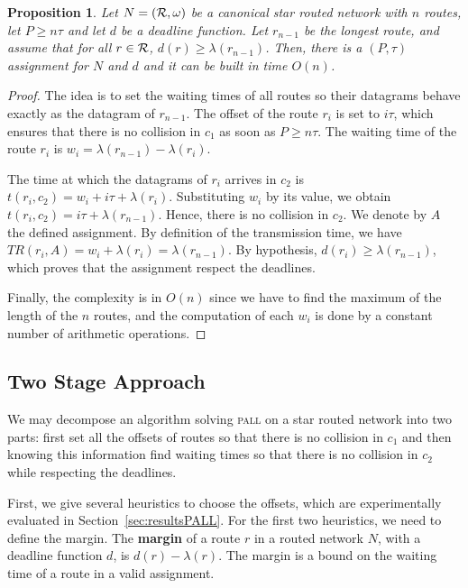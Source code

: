 \documentclass[a4paper,10pt]{journal}
\newtheorem{proposition}{Proposition}
\newcommand\pall{\textsc{pall}\xspace}
\begin{document}
	 \begin{proposition}\label{prop:asym}
	Let $N = ({\cal R}, \omega)$ be a canonical star routed network with $n$ routes, let $P \geq n\tau$ and let $d$ be a deadline function. Let $r_{n-1}$ be the longest route, and assume that for all $r\in {\cal R}$, $d(r) \geq \lambda(r_{n-1})$. Then, there is a $(P,\tau)$ assignment for $N$ and $d$ and it can be built in time $O(n)$.
	 \end{proposition}
      \begin{proof}
       The idea is to set the waiting times of all routes so their datagrams behave exactly as the datagram of $r_{n-1}$. The offset of the route $r_i$ is set to $i\tau$, which ensures that there is no collision in $c_1$ as soon as $P \geq n\tau$. The waiting time of the route $r_i$ is $w_i = \lambda(r_{n-1}) - \lambda(r_{i})$.
        
    The time at which the datagrams of $r_i$ arrives in $c_2$ is $t(r_i, c_2) = w_i + i\tau + \lambda(r_{i})$. Substituting $w_i$ by its value, we obtain $t(r_i, c_2) =  i\tau + \lambda(r_{n-1})$.
    Hence, there is no collision in $c_2$. We denote by $A$ the defined assignment. By definition of the transmission time, we have $TR(r_i,A) = w_i + \lambda(r_i) = \lambda(r_{n-1})$. By hypothesis, $d(r_i) \geq \lambda(r_{n-1})$, which proves that the assignment respect the deadlines.

	Finally, the complexity is in $O(n)$ since we have to find the maximum of the length of the $n$ routes, and the computation of each $w_i$ is done by a constant number of arithmetic operations.
     \end{proof}
     
    
     \subsection{Two Stage Approach}
     
      We may decompose an algorithm solving \pall on a star routed network into two parts: first set all the offsets of routes so that there is no collision in $c_1$ and then knowing this information find waiting times so that there is no collision in $c_2$ while respecting the deadlines.

First, we give several heuristics to choose the offsets, which are experimentally evaluated in Section~\ref{sec:resultsPALL}.
For the first two heuristics, we need to define the margin. The \textbf{margin} of a route $r$ in a routed network $N$, with a deadline function $d$, is $ d(r) - \lambda(r)$. The margin is a bound on the waiting time of a route in a valid assignment.
\end{document}
